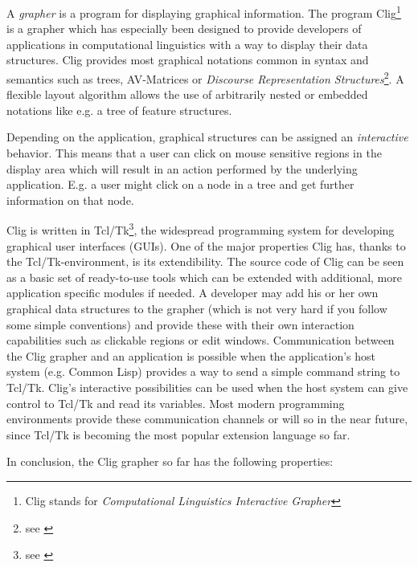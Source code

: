 A {\em grapher\/} is a program for displaying graphical information.
The program {\sc Clig}\footnote{{\sc Clig} stands for {\em
Computational Linguistics Interactive Grapher}} is a grapher which has
especially been designed to provide developers of applications in
computational linguistics with a way to display their data structures.
{\sc Clig} provides most graphical notations common in syntax and
semantics such as trees, AV-Matrices or {\it Discourse Representation
Structures}\footnote{see \cite{Kamp 93}}. A flexible layout algorithm
allows the use of arbitrarily nested or embedded notations like e.g. a
tree of feature structures.

Depending on the application, graphical structures can be assigned an
{\it interactive\/} behavior.  This means that a user can click on
mouse sensitive regions in the display area which will result in an
action performed by the underlying application. E.g. a user might click
on a node in a tree and get further information on that node.

{\sc Clig} is written in Tcl/Tk\footnote{see \cite{Ousterhout 94}}, the
widespread programming system for developing graphical user interfaces
(GUIs). One of the major properties {\sc Clig} has, thanks to the
Tcl/Tk-environment, is its extendibility. The source code of {\sc Clig}
can be seen as a basic set of ready-to-use tools which can be extended
with additional, more application specific modules if needed. A
developer may add his or her own graphical data structures to the
grapher (which is not very hard if you follow some simple conventions)
and provide these with their own interaction capabilities such as
clickable regions or edit windows. Communication between the {\sc Clig}
grapher and an application is possible when the application's host
system (e.g. {\sc Common Lisp}) provides a way to send a simple command
string to Tcl/Tk. {\sc Clig}'s interactive possibilities can be used
when the host system can give control to Tcl/Tk and read its
variables. Most modern programming environments provide these
communication channels or will so in the near future, since Tcl/Tk is
becoming the most popular extension language so far.

In conclusion, the {\sc Clig} grapher so far has the following
properties:

